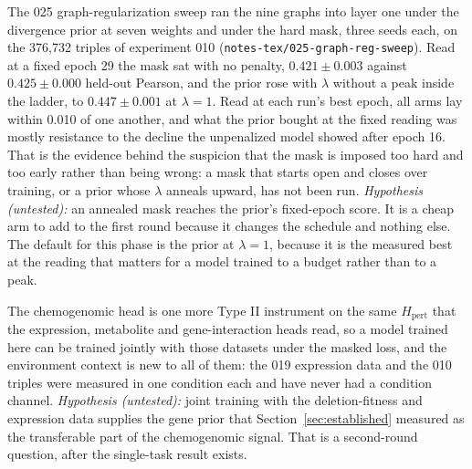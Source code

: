 The 025 graph-regularization sweep ran the nine graphs into layer one under the divergence
prior at seven weights and under the hard mask, three seeds each, on the 376{,}732 triples of
experiment 010 (\texttt{notes-tex/025-graph-reg-sweep}). Read at a fixed epoch 29 the mask
sat with no penalty, $0.421 \pm 0.003$ against $0.425 \pm 0.000$ held-out Pearson, and the
prior rose with $\lambda$ without a peak inside the ladder, to $0.447 \pm 0.001$ at $\lambda
= 1$. Read at each run's best epoch, all arms lay within 0.010 of one another, and what the
prior bought at the fixed reading was mostly resistance to the decline the unpenalized model
showed after epoch 16. That is the evidence behind the suspicion that the mask is imposed too
hard and too early rather than being wrong: a mask that starts open and closes over training,
or a prior whose $\lambda$ anneals upward, has not been run. \textit{Hypothesis (untested):}
an annealed mask reaches the prior's fixed-epoch score. It is a cheap arm to add to the first
round because it changes the schedule and nothing else. The default for this phase is the
prior at $\lambda = 1$, because it is the measured best at the reading that matters for a
model trained to a budget rather than to a peak.

The chemogenomic head is one more Type II instrument on the same $H_{\mathrm{pert}}$ that
the expression, metabolite and gene-interaction heads read, so a model trained here can be
trained jointly with those datasets under the masked loss, and the environment context is
new to all of them: the 019 expression data and the 010 triples were measured in one
condition each and have never had a condition channel. \textit{Hypothesis (untested):} joint
training with the deletion-fitness and expression data supplies the gene prior that
Section~\ref{sec:established} measured as the transferable part of the chemogenomic signal.
That is a second-round question, after the single-task result exists.
